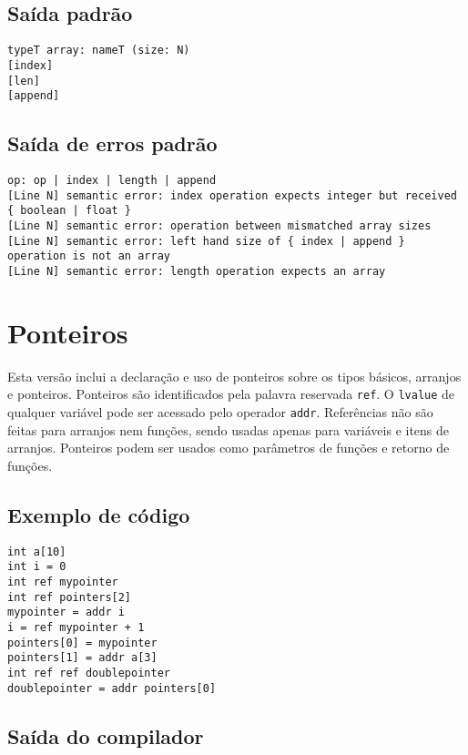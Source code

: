 \documentclass{article}
\begin{document}
\subsection{Saída padrão}

\begin{verbatim}
typeT array: nameT (size: N)
[index]
[len]
[append]
\end{verbatim}

\subsection{Saída de erros padrão}

\begin{verbatim}
op: op | index | length | append
[Line N] semantic error: index operation expects integer but received { boolean | float }
[Line N] semantic error: operation between mismatched array sizes
[Line N] semantic error: left hand size of { index | append } operation is not an array
[Line N] semantic error: length operation expects an array
\end{verbatim}

\section{Ponteiros}

Esta versão inclui a declaração e uso de ponteiros sobre os tipos básicos,
arranjos e ponteiros. Ponteiros são identificados pela palavra reservada
\texttt{ref}. O \texttt{lvalue} de qualquer variável pode ser acessado pelo
operador \texttt{addr}. Referências não são feitas para arranjos nem funções,
sendo usadas apenas para variáveis e itens de arranjos. Ponteiros podem ser
usados como parâmetros de funções e retorno de funções.

\subsection{Exemplo de código}

\begin{verbatim}
int a[10]
int i = 0
int ref mypointer
int ref pointers[2]
mypointer = addr i
i = ref mypointer + 1
pointers[0] = mypointer
pointers[1] = addr a[3]
int ref ref doublepointer
doublepointer = addr pointers[0]
\end{verbatim}

\subsection{Saída do compilador}
\end{document}
